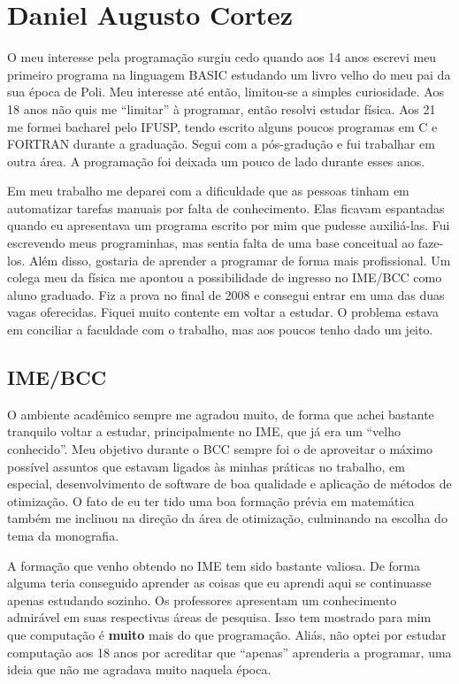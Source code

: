 \section{Daniel Augusto Cortez}
\label{sec:daniel_subjetiva}

O meu interesse pela programação surgiu cedo quando aos 14 anos escrevi meu primeiro programa na
linguagem BASIC estudando um livro velho do meu pai da sua época de Poli. Meu interesse até então,
limitou-se a simples curiosidade. Aos 18 anos não quis me ``limitar'' à programar, então resolvi
estudar física. Aos 21 me formei bacharel pelo IFUSP, tendo escrito alguns poucos programas em C e
FORTRAN durante a graduação. Segui com a pós-gradução e fui trabalhar em outra área. A programação
foi deixada um pouco de lado durante esses anos.

Em meu trabalho me deparei com a dificuldade que as pessoas tinham em automatizar tarefas manuais
por falta de conhecimento. Elas ficavam espantadas quando eu apresentava um programa escrito por mim
que pudesse auxiliá-las. Fui escrevendo meus programinhas, mas sentia falta de uma base conceitual
ao faze-los. Além disso, gostaria de aprender a programar de forma mais profissional. Um colega meu
da física me apontou a possibilidade de ingresso no IME/BCC como aluno graduado. Fiz a prova no
final de 2008 e consegui entrar em uma das duas vagas oferecidas. Fiquei muito contente em voltar a
estudar. O problema estava em conciliar a faculdade com o trabalho, mas aos poucos tenho dado um
jeito.

\subsection{IME/BCC}

O ambiente acadêmico sempre me agradou muito, de forma que achei bastante tranquilo voltar a
estudar, principalmente no IME, que já era um ``velho conhecido''. Meu objetivo durante o BCC sempre
foi o de aproveitar o máximo possível assuntos que estavam ligados às minhas práticas no trabalho,
em especial, desenvolvimento de software de boa qualidade e aplicação de métodos de otimização. O
fato de eu ter tido uma boa formação prévia em matemática também me inclinou na direção da área de 
otimização, culminando na escolha do tema da monografia.

A formação que venho obtendo no IME tem sido bastante valiosa. De forma alguma teria conseguido
aprender as coisas que eu aprendi aqui se continuasse apenas estudando sozinho. Os professores
apresentam um conhecimento admirável em suas respectivas áreas de pesquisa. Isso tem mostrado para
mim que computação é {\bf muito} mais do que programação. Aliás, não optei por estudar computação
aos 18 anos por acreditar que ``apenas'' aprenderia a programar, uma ideia que não me agradava muito
naquela época.

